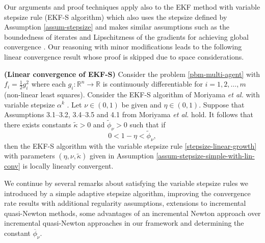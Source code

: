 \documentclass[final,numbook]{svjour3}
\begin{document}
Our arguments and proof techniques apply also to the EKF method with variable stepsize rule (EKF-S algorithm) which also uses the stepsize defined by Assumption \ref{assum-stepsize} and makes similar assumptions such as the boundedness of iterates and Lipschitzness of the gradients for achieving global convergence \cite{AlgEkfs2003}. Our reasoning with minor modifications leads to the following linear convergence result whose proof is skipped due to space considerations. 
\begin{corollary}\label{coro-linear-conv-EKF} \textbf{(Linear convergence of EKF-S)} Consider the problem \eqref{pbm-multi-agent} with $f_i = \frac{1}{2} g_i^2$ where each $g_i:{\mathbb R}^n \to {\mathbb R}$ is continuously differentiable for $i=1,2,\dots,m$ (non-linear least squares). Consider the EKF-S algorithm of Moriyama \textit{et al.} with variable stepsize $\alpha^k$ \cite{AlgEkfs2003}. 
Let $\nu \in (0,1)$ be given and $\eta \in (0,1)$. Suppose that Assumptions 3.1--3.2, 3.4--3.5 and 4.1 from Moriyama \textit{et al.} \cite{AlgEkfs2003} hold. It follows that there exists constants $\tilde \kappa>0$ and $\tilde \phi_\nu > 0$ such that if 
  $$ 0 <1- \eta < \tilde \phi_\nu,$$
then the EKF-S algorithm with the variable stepsize rule \eqref{stepsize-linear-growth} with parameters $(\eta,\nu,\tilde \kappa)$ given in Assumption \ref{assum-stepsize-simple-with-lin-conv} is locally linearly convergent. 
\end{corollary}

We continue by several remarks about satisfying the variable stepsize rules we introduced by a simple adaptive stepsize algorithm, improving the convergence rate results with additional regularity assumptions, extensions to incremental quasi-Newton methods, some advantages of an incremental Newton approach over incremental quasi-Newton approaches in our framework and determining the constant $\overline{\phi}_{\nu}$.  
\end{document}
